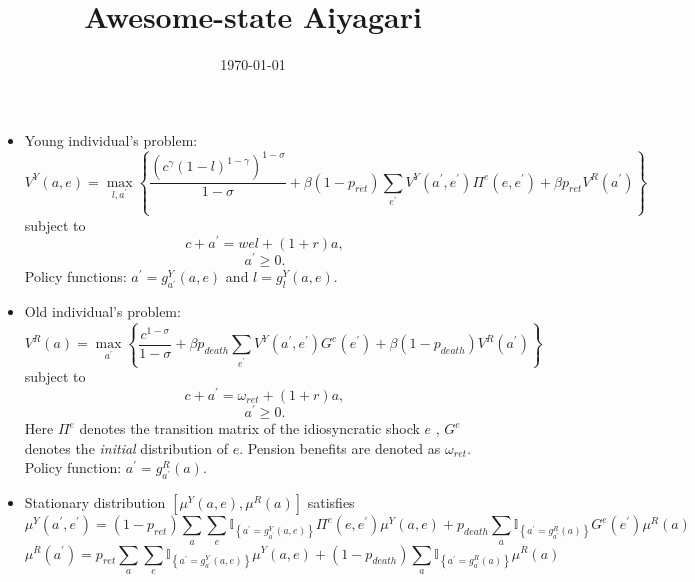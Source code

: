 \documentclass[12pt]{article}
\begin{document}
\title{\textbf{Awesome-state Aiyagari}}
\date{\today }
\author{}
\maketitle

\begin{itemize}
\item Young individual's problem:%
\begin{equation*}
V^{Y}(a,e)=\max_{l,a^{\prime }}\left\{ \frac{\left( c^{\gamma }\left(
1-l\right) ^{1-\gamma }\right) ^{1-\sigma }}{1-\sigma }+\beta \left(
1-p_{ret}\right) \sum_{e^{\prime }}V^{Y}(a^{\prime },e^{\prime })\Pi
^{e}(e,e^{\prime })+\beta p_{ret}V^{R}(a^{\prime })\right\} 
\end{equation*}%
subject to%
\begin{equation*}
c+a^{\prime }=wel+(1+r)a,
\end{equation*}%
\begin{equation*}
a^{\prime }\geq 0.
\end{equation*}%
Policy functions: $a^{\prime }=g_{a^{\prime }}^{Y}(a,e)$ and $%
l=g_{l}^{Y}(a,e)$.

\item Old individual's problem:%
\begin{equation*}
V^{R}(a)=\max_{a^{\prime }}\left\{ \frac{c^{1-\sigma }}{1-\sigma }+\beta
p_{death}\sum_{e^{\prime }}V^{Y}(a^{\prime },e^{\prime })G^{e}(e^{\prime
})+\beta \left( 1-p_{death}\right) V^{R}(a^{\prime })\right\} 
\end{equation*}%
subject to%
\begin{equation*}
c+a^{\prime }=\omega _{ret}+(1+r)a,
\end{equation*}%
\begin{equation*}
a^{\prime }\geq 0.
\end{equation*}%
Here $\Pi ^{e}$ denotes the transition matrix of the idiosyncratic shock $e$%
, $G^{e}$ denotes the \textit{initial} distribution of $e$. Pension benefits
are denoted as $\omega _{ret}$. Policy function: $a^{\prime }=g_{a^{\prime
}}^{R}(a)$.

\item Stationary distribution $\left[ \mu ^{Y}(a,e),\mu ^{R}(a)\right] $
satisfies%
\begin{equation*}
\mu ^{Y}(a^{\prime },e^{\prime })=\left( 1-p_{ret}\right) \sum_{a}\sum_{e}%
\mathbb{I}_{\left\{ a^{\prime }=g_{a^{\prime }}^{Y}\left( a,e\right)
\right\} }\Pi ^{e}(e,e^{\prime })\mu ^{Y}(a,e)+p_{death}\sum_{a}\mathbb{I}%
_{\left\{ a^{\prime }=g_{a^{\prime }}^{R}\left( a\right) \right\}
}G^{e}(e^{\prime })\mu ^{R}(a)
\end{equation*}%
\begin{equation*}
\mu ^{R}(a^{\prime })=p_{ret}\sum_{a}\sum_{e}\mathbb{I}_{\left\{ a^{\prime
}=g_{a^{\prime }}^{Y}\left( a,e\right) \right\} }\mu
^{Y}(a,e)+(1-p_{death})\sum_{a}\mathbb{I}_{\left\{ a^{\prime }=g_{a^{\prime
}}^{R}\left( a\right) \right\} }\mu ^{R}(a)
\end{equation*}


\end{itemize}
\end{document}
